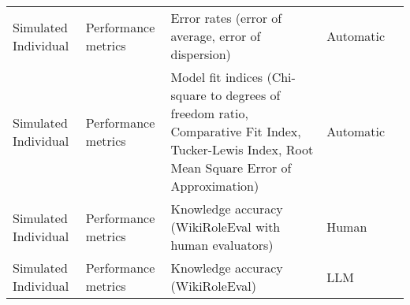 \begin{small}
\begin{center}
\begin{longtable}{@{}p{}p{}p{}p{}p{}@{}}
Simulated Individual     & Performance metrics                 & Error rates (error of average, error of dispersion)                                                                                                                                                         & Automatic & \cite{lin2024diversedialoguemethodologydesigningchatbots}                                                                                                                                                                                                                                                                                                                                                                                            \\
Simulated Individual     & Performance metrics                 & Model fit indices (Chi-square to degrees of freedom ratio, Comparative Fit Index, Tucker-Lewis Index, Root Mean Square Error of Approximation)                                                              & Automatic & \cite{Ke2024HumanAISI}                                                                                                                                                                                                                                                                                                                                                                                           \\
Simulated Individual     & Performance metrics                 & Knowledge accuracy (WikiRoleEval with human evaluators)                                                                                                                                                     & Human     & \cite{tang2024erabalenhancingroleplayingagents}                                                                                                                                                                                                                                                                                                                                                                                              \\
Simulated Individual     & Performance metrics                 & Knowledge accuracy (WikiRoleEval)                                                                                                                                                                           & LLM       & \cite{tang2024erabalenhancingroleplayingagents}                                                                                                                                                                                                                                                                                                                                                                                              \\

\end{longtable}
\end{center}
\end{small}
